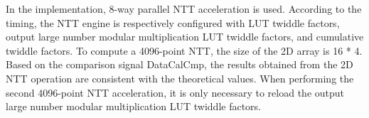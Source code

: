 In the implementation, 8-way parallel NTT acceleration is used. According to the timing, the NTT engine is respectively configured with LUT twiddle factors, output large number modular multiplication LUT twiddle factors, and cumulative twiddle factors. To compute a 4096-point NTT, the size of the 2D array is 16 * 4. Based on the comparison signal DataCalCmp, the results obtained from the 2D NTT operation are consistent with the theoretical values. When performing the second 4096-point NTT acceleration, it is only necessary to reload the output large number modular multiplication LUT twiddle factors.





